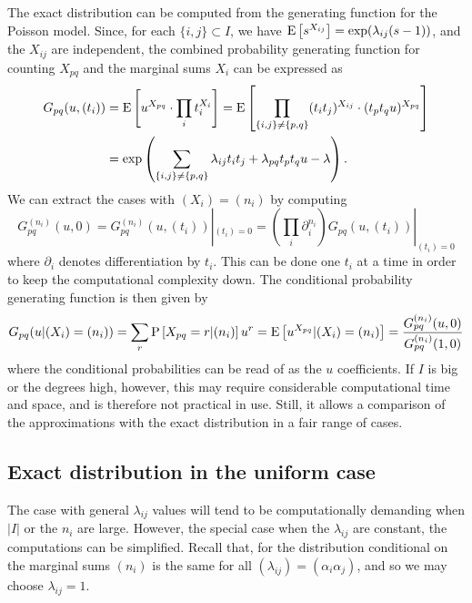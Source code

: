 \documentclass{myaptpub}%
\newcommand\inpair[1]{\subset #1}
\newcommand\Prob{\sP}
\newcommand\PR[1]{\Prob\left[#1\right]}
\newcommand\Exp[1]{\sE\left[#1\right]}
\begin{document}
The exact distribution can be computed from the generating function for the Poisson model. Since, for each $\{i,j\}\inpair{I}$, we have $\Exp{s^{X_{ij}}}=\exp(\lambda_{ij}(s-1))$, and the $X_{ij}$ are independent, the combined probability generating function for counting $X_{pq}$ and the marginal sums $X_i$ can be expressed as
\begin{equation}\nonumber
\begin{split}
G_{pq}(u,(t_i))
&=\Exp{u^{X_{pq}}\cdot\prod_i t_i^{X_i}}
=\Exp{\prod_{\{i,j\}\not=\{p,q\}}(t_it_j)^{X_{ij}}\cdot(t_pt_qu)^{X_{pq}}}\\
&=\exp\left(\sum_{\{i,j\}\not=\{p,q\}}\lambda_{ij}t_it_j+\lambda_{pq}t_pt_qu-\lambda\right).
\end{split}
\end{equation}
We can extract the cases with $(X_i)=(n_i)$ by computing
\begin{equation}\nonumber
G^{(n_i)}_{pq}(u,0)
=G^{(n_i)}_{pq}(u,(t_i))|_{(t_i)=0}
=\left(\prod_i\partial_i^{n_i}\right)G_{pq}(u,(t_i))|_{(t_i)=0}
\end{equation}
where $\partial_i$ denotes differentiation by $t_i$. This can be done one $t_i$ at a time in order to keep the computational complexity down. The conditional probability generating function is then given by
\begin{equation}\label{eq:gf-cond}
G_{pq}(u|(X_i)=(n_i))
=\sum_r \PR{X_{pq}=r|(n_i)}u^r
=\Exp{u^{X_{pq}}|(X_i)=(n_i)}
=\frac{G^{(n_i)}_{pq}(u,0)}{G^{(n_i)}_{pq}(1,0)}
\end{equation}
where the conditional probabilities can be read of as the $u$ coefficients. If $I$ is big or the degrees high, however, this may require considerable computational time and space, and is therefore not practical in use. Still, it allows a comparison of the approximations with the exact distribution in a fair range of cases.

\subsection{Exact distribution in the uniform case}

The case with general $\lambda_{ij}$ values will tend to be computationally demanding when $|I|$ or the $n_i$ are large. However, the special case when the $\lambda_{ij}$ are constant, the computations can be simplified. Recall that, for the distribution conditional on the marginal sums $(n_i)$ is the same for all $(\lambda_{ij})=(\alpha_i\alpha_j)$, and so we may choose $\lambda_{ij}=1$.
\end{document}
